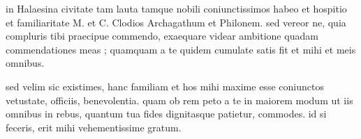 


 in Halaesina civitate tam lauta tamque nobili coniunctissimos habeo et hospitio et familiaritate M. et C. Clodios Archagathum et Philonem. sed vereor ne, quia compluris tibi praecipue commendo, exaequare videar ambitione quadam commendationes meas ; quamquam a te quidem cumulate satis fit et mihi et meis omnibus.

 sed velim sic existimes, hanc familiam et hos mihi maxime esse coniunctos vetustate, officiis, benevolentia. quam ob rem peto a te in maiorem modum ut iis omnibus in rebus, quantum tua fides dignitasque patietur, commodes. id si feceris, erit mihi vehementissime gratum.
